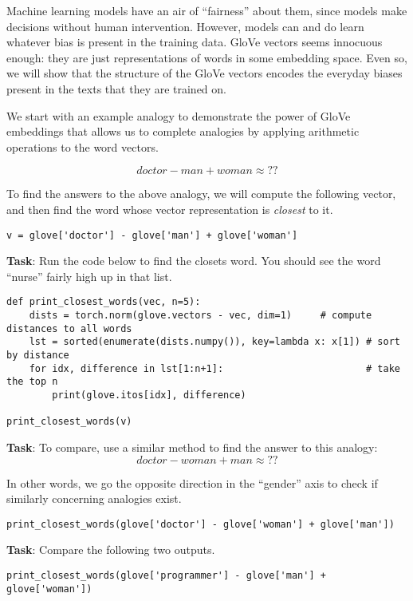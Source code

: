 \documentclass[
  letterpaper,
  DIV=11,
  numbers=noendperiod]{scrartcl}
\begin{document}
Machine learning models have an air of ``fairness'' about them, since
models make decisions without human intervention. However, models can
and do learn whatever bias is present in the training data. GloVe
vectors seems innocuous enough: they are just representations of words
in some embedding space. Even so, we will show that the structure of the
GloVe vectors encodes the everyday biases present in the texts that they
are trained on.

We start with an example analogy to demonstrate the power of GloVe
embeddings that allows us to complete analogies by applying arithmetic
operations to the word vectors.

\[doctor - man + woman \approx ??\]

To find the answers to the above analogy, we will compute the following
vector, and then find the word whose vector representation is
\emph{closest} to it.

\begin{verbatim}
v = glove['doctor'] - glove['man'] + glove['woman']
\end{verbatim}

\textbf{Task}: Run the code below to find the closets word. You should
see the word ``nurse'' fairly high up in that list.

\begin{verbatim}
def print_closest_words(vec, n=5):
    dists = torch.norm(glove.vectors - vec, dim=1)     # compute distances to all words
    lst = sorted(enumerate(dists.numpy()), key=lambda x: x[1]) # sort by distance
    for idx, difference in lst[1:n+1]:                         # take the top n
        print(glove.itos[idx], difference)

print_closest_words(v)
\end{verbatim}

\textbf{Task}: To compare, use a similar method to find the answer to
this analogy: \[doctor - woman + man \approx ??\]

In other words, we go the opposite direction in the ``gender'' axis to
check if similarly concerning analogies exist.

\begin{verbatim}
print_closest_words(glove['doctor'] - glove['woman'] + glove['man'])
\end{verbatim}

\textbf{Task}: Compare the following two outputs.

\begin{verbatim}
print_closest_words(glove['programmer'] - glove['man'] + glove['woman'])
\end{verbatim}
\end{document}
